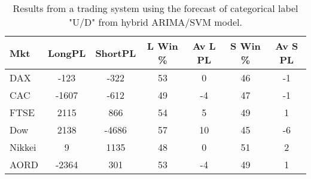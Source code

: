 \begin{table}[ht]
\centering
\caption[Results from a trading system using the forecast of categorical label "U/D" from hybrid ARIMA/SVM model]{Results from a trading system using the forecast of categorical label "U/D" from hybrid ARIMA/SVM model.} 
\label{tab:chp_ts:pUD_CAT_arima_svm_sys}
\begin{tabular}{lcccccc}
  \toprule Mkt & LongPL & ShortPL & L Win \% & Av L PL & S Win \% & Av S PL \\ 
  \midrule DAX & -123 & -322 & 53 & 0 & 46 & -1 \\ 
  CAC & -1607 & -612 & 49 & -4 & 47 & -1 \\ 
  FTSE & 2115 & 866 & 54 & 5 & 49 & 1 \\ 
  Dow & 2138 & -4686 & 57 & 10 & 45 & -6 \\ 
  Nikkei & 9 & 1135 & 48 & 0 & 51 & 2 \\ 
  AORD & -2364 & 301 & 53 & -4 & 49 & 1 \\ 
   \bottomrule \end{tabular}
\end{table}
